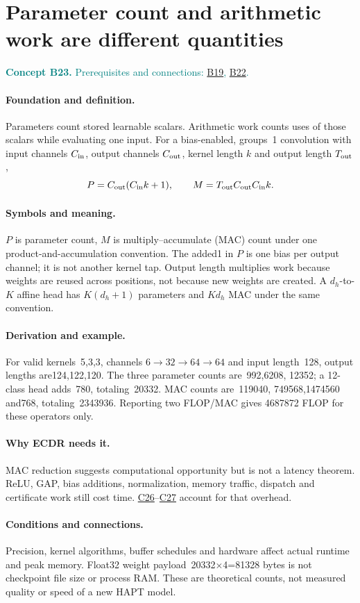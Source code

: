 \documentclass[11pt,a4paper]{article}
\newcommand{\conceptid}{Front matter}
\newcommand{\concept}[3]{\clearpage\renewcommand{\conceptid}{#1}%
\section{#2}\label{concept:#1}%
\textcolor{teal}{\textbf{Concept #1.} Prerequisites and connections: #3.}\par
\typeout{ECDR-CONCEPT-START #1 PAGE=\thepage}}
\begin{document}
\concept{B23}{Parameter count and arithmetic work are different quantities}{\hyperref[concept:B19]{B19}, \hyperref[concept:B22]{B22}}
\paragraph{Foundation and definition.}
Parameters count stored learnable scalars. Arithmetic work counts uses of
those scalars while evaluating one input. For a bias-enabled, groups~1
convolution with input channels $C_{\rm in}$, output channels $C_{\rm out}$,
kernel length $k$ and output length $T_{\rm out}$,
\[
 P=C_{\rm out}(C_{\rm in}k+1),\qquad
 M=T_{\rm out}C_{\rm out}C_{\rm in}k.
\]
\paragraph{Symbols and meaning.}
$P$ is parameter count, $M$ is multiply--accumulate (MAC) count under one
product-and-accumulation convention. The added1 in $P$ is one bias per
output channel; it is not another kernel tap. Output length multiplies
work because weights are reused across positions, not because new weights
are created. A $d_h$-to-$K$ affine head has $K(d_h+1)$ parameters and
$Kd_h$ MAC under the same convention.
\paragraph{Derivation and example.}
For valid kernels~5,3,3, channels $6\to32\to64\to64$ and input length~128,
output lengths are124,122,120. The three parameter counts are~992,6208,
12352; a 12-class head adds~780, totaling~20332. MAC counts are~119040,
749568,1474560 and768, totaling~2343936. Reporting two FLOP/MAC gives
4687872 FLOP for these operators only.
\paragraph{Why ECDR needs it.}
MAC reduction suggests computational opportunity but is not a latency
theorem. ReLU, GAP, bias additions, normalization, memory traffic, dispatch
and certificate work still cost time. \hyperref[concept:C26]{C26}--\hyperref[concept:C27]{C27} account for that overhead.
\paragraph{Conditions and connections.}
Precision, kernel algorithms, buffer schedules and hardware affect actual
runtime and peak memory. Float32 weight payload~20332$\times$4=81328 bytes
is not checkpoint file size or process RAM. These are theoretical counts,
not measured quality or speed of a new HAPT model.
\par\label{endconcept:B23}
\end{document}
